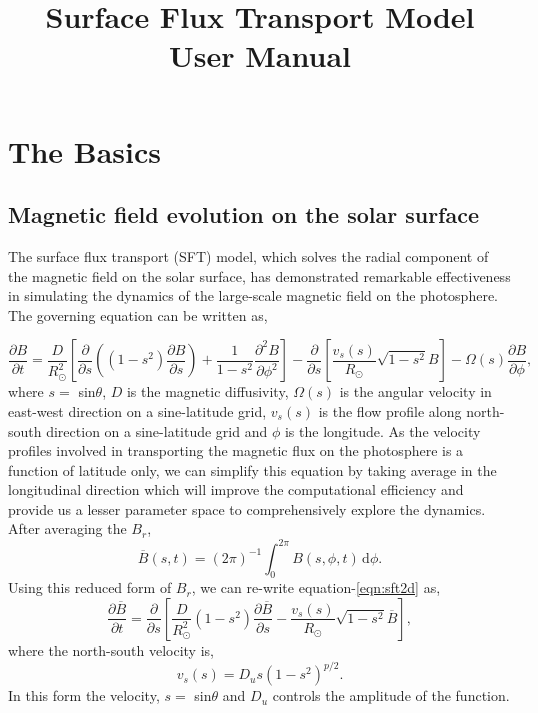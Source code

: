 \documentclass[twoside,12pt]{book}
\title{Surface Flux Transport Model User Manual}
\begin{document}
\maketitle

\chapter{The Basics \label{chapter:basics}}

\section{Magnetic field evolution on the solar surface}


The surface flux transport (SFT) model, which solves the radial component of the magnetic field on the solar surface, has demonstrated remarkable effectiveness in simulating the dynamics of the large-scale magnetic field on the photosphere. The governing equation can be written as,

\begin{equation}
\frac{\partial B}{\partial t} = \frac{D}{R_\odot^2}\left[\frac{\partial}{\partial s}\left((1-s^2)\frac{\partial B}{\partial s}\right) + \frac{1}{1-s^2}\frac{\partial^2B}{\partial\phi^2}\right] - \frac{\partial}{\partial s}\left[\frac{v_s(s)}{R_\odot}\sqrt{1-s^2} B\right]- \Omega(s)\frac{\partial B}{\partial\phi},
\label{eqn:sft2d}
\end{equation}
where $s =$ sin$\theta$, $D$ is the magnetic diffusivity, $\Omega (s)$ is the angular velocity in east-west direction on a sine-latitude grid, $v_s (s)$ is the flow profile along north-south direction on a sine-latitude grid and $\phi$ is the longitude. As the velocity profiles involved in transporting the magnetic flux on the photosphere is a function of latitude only, we can simplify this equation by taking average in the longitudinal direction which will improve the computational efficiency and provide us a lesser parameter space to comprehensively explore the dynamics. After averaging the $B_r$, 
\begin{equation}
\overline{B}(s,t)=(2\pi)^{-1}\int_0^{2\pi}B(s,\phi,t)\,\mathrm{d}\phi.
\label{eqn:sft1d}
\end{equation}
Using this reduced form of $B_r$, we can re-write equation-\ref{eqn:sft2d} as,
\begin{equation}
\frac{\partial\overline{B}}{\partial t} = \frac{\partial}{\partial s}\left[\frac{D}{R_\odot^2}(1-s^2)\frac{\partial\overline{B}}{\partial s} - \frac{v_s(s)}{R_\odot}\sqrt{1-s^2}\overline{B}\right],
\label{eqn:evol}
\end{equation}
where the north-south velocity is,
\begin{equation}
v_s(s) = D_us(1-s^2)^{p/2}.
\label{eqn:merid}
\end{equation}
In this form the velocity, $s =$ sin$\theta$ and $D_u$ controls the amplitude of the function. 
\end{document}
